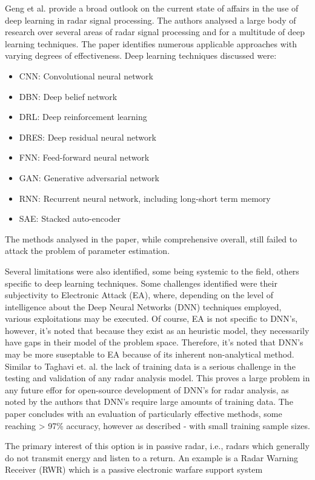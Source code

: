 Geng et al. \cite{mason_deep_2017} provide a broad outlook on the current state of affairs in the use of deep learning in radar signal processing. The authors analysed a large body of research over several areas of radar signal processing and for a multitude of deep learning techniques. The paper identifies numerous applicable approaches with varying degrees of effectiveness. Deep learning techniques discussed were:
\begin{itemize}
    \item CNN: Convolutional neural network
    \item DBN: Deep belief network
    \item DRL: Deep reinforcement learning
    \item DRES: Deep residual neural network
    \item FNN: Feed-forward neural network
    \item GAN: Generative adversarial network
    \item RNN: Recurrent neural network, including long-short term memory
    \item SAE: Stacked auto-encoder
\end{itemize}

The methods analysed in the paper, while comprehensive overall, still failed to attack the problem of parameter estimation. 

Several limitations were also identified, some being systemic to the field, others specific to deep learning techniques. Some challenges identified were their subjectivity to Electronic Attack (EA), where, depending on the level of intelligence about the Deep Neural Networks (DNN) techniques employed, various exploitations may be executed. Of course, EA is not specific to DNN's, however, it's noted that because they exist as an heuristic model, they necessarily have gaps in their model of the problem space. Therefore, it's noted that DNN's may be more suseptable to EA because of its inherent non-analytical method. Similar to Taghavi et. al. the lack of training data is a serious challenge in the testing and validation of any radar analysis model. This proves a large problem in any future effor for open-source development of DNN's for radar analysis, as noted by the authors that DNN's require large amounts of training data. The paper concludes with an evaluation of particularly effective methods, some reaching > 97\% accuracy, however as described - with small training sample sizes.

The primary interest of this option is in passive radar, i.e., radars which generally do not transmit energy and listen to a return. An example is a Radar Warning Receiver (RWR) which is a passive electronic warfare support system \cite{avionics_department_electronic_2013}

